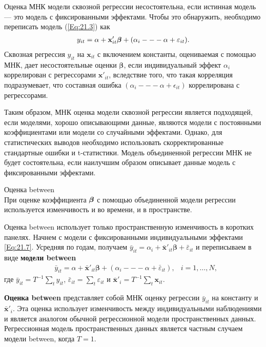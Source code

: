 Оценка МНК модели сквозной регрессии несостоятельна, если истинная модель --- это модель с фиксированными эффектами. Чтобы это обнаружить, необходимо переписать модель (\ref{Eq:21.3}) как 
\begin{align}
y_{it} = \alpha +  \mathbf x'_{it} \bm{\beta} + (\alpha_i --- \alpha + \varepsilon_{it}).
\nonumber
\end{align}
Сквозная регрессия  $y_{it}$ на $\mathbf x_{it}$ с включением константы, оцениваемая с помощью МНК, дает несостоятельные оценки $\bm{\beta}$, если индивидуальный эффект $\alpha_i$ коррелирован с регрессорами $\mathbf x'_{it}$, вследствие того, что такая корреляция подразумевает, что составная ошибка $(\alpha_i --- \alpha + \epsilon_{it})$ коррелирована с регрессорами.

Таким образом, МНК оценка модели сквозной регрессии  
является подходящей, если моделями, хорошо описывающими данные, являются модели с постоянными коэффициентами или модели со случайными эффектами. Однако, для статистических выводов необходимо использовать скорректированные стандартные ошибки и t-статистики. Модель объединенной регрессии МНК не будет состоятельна, если наилучшим образом описывает данные модель с фиксированными эффектами.

{\centering
Оценка between \\}
При оценке коэффициента $\bm{\beta}$ с помощью объединенной модели регрессии используется изменчивость и во времени, и в пространстве.

Оценка between использует только пространственную изменчивость в коротких панелях. Начнем с модели с фиксированными индивидуальными эффектами \ref{Eq:21.7}. Усредняя по годам, получаем $\bar{y}_{it} = \alpha_i +  \bar{\mathbf x}'_{it} \bm{\beta} +\bar{\varepsilon}_{it}$ и переписываем в виде  \textbf{модели between}
\begin{align}
& \bar{y}_{it} = \alpha +  \bar{\mathbf x}'_{it} \bm{\beta} + (\alpha_i --- \alpha + \bar{\varepsilon}_{it}),
& i=1, \dots, N,
\label{Eq:21.7}
\end{align}
где $\bar{y}_{it} =T^{-1}\sum_t {y}_{it}$, $\bar{\varepsilon}_{it}=\sum_t {\varepsilon}_{it}$ и $\bar{\mathbf x}'_{i}=T^{-1}\sum_t {\mathbf x}_{it}$.

\textbf{Оценка between} представляет собой МНК оценку регрессии $\bar{y}_{it}$ на константу и $\bar{\mathbf x}'_{i}$. Эта оценка использует изменчивость между индивидуальными наблюдениями и является аналогом обычной регрессионной модели пространственных данных. Регрессионная модель пространственных данных является частным случаем модели between, когда $T=1$.

